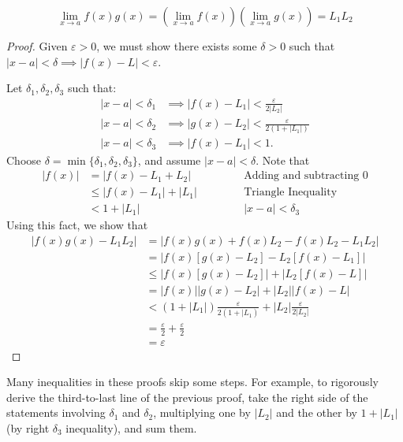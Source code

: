 \documentclass{article}
\begin{document}
\begin{theorem}
$$\lim_{x \to a} f(x)g(x) = \left(\lim_{x \to a} f(x)\right) \left(\lim_{x \to a} g(x) \right) = L_1 L_2$$
\end{theorem}
\begin{proof}
    Given $\varepsilon > 0$, we must show there exists some $\delta > 0$ such that $|x - a| < \delta \implies |f(x) - L| < \varepsilon$.

    Let $\delta_1, \delta_2, \delta_3$ such that:
    \begin{align*}
    |x - a| < \delta_1 &\implies |f(x) - L_1| < \frac{\varepsilon}{2 |L_2|}\\
    |x - a| < \delta_2 &\implies |g(x) - L_2| < \frac{\varepsilon}{2 (1 + |L_1|)}\\
    |x - a| < \delta_3 &\implies |f(x) - L_1| < 1.
    \end{align*}
    Choose $\delta = \min\{\delta_1, \delta_2, \delta_3\}$, and assume $|x - a| < \delta$. Note that
    \begin{align}
        |f(x)| &= |f(x) - L_1 + L_2| \hspace{4em} &\text{Adding and subtracting 0} \\
        &\leq |f(x) - L_1| + |L_1| & \text{Triangle Inequality} \\
        &< 1 + |L_1| & \text{$|x - a| < \delta_3$}
    \end{align}
    Using this fact, we show that
    \begin{align*}
        |f(x)g(x) - L_1 L_2| &= |f(x)g(x) + f(x) L_2 - f(x) L_2 - L_1 L_2| \\
        &= |f(x)[g(x) - L_2] - L_2[f(x) - L_1]| \\
        &\leq |f(x)[g(x)-L_2]| + |L_2[f(x) - L]| \\
        &= |f(x)| |g(x) - L_2| + |L_2| |f(x) - L| \\
        &< (1 + |L_1|) \frac{\varepsilon}{2(1 + |L_1)} + |L_2| \frac{\varepsilon}{2|L_2|} \\
        &= \frac{\varepsilon}{2} + \frac{\varepsilon}{2} \\
        &= \varepsilon
    \end{align*}
\end{proof}

\begin{remark}
Many inequalities in these proofs skip some steps. For example, to rigorously derive the third-to-last line of the previous proof, take the right side of the statements involving $\delta_1$ and $\delta_2$, multiplying one by $|L_2|$ and the other by $1 + |L_1|$ (by right $\delta_3$ inequality), and sum them.
\end{remark}
\end{document}
